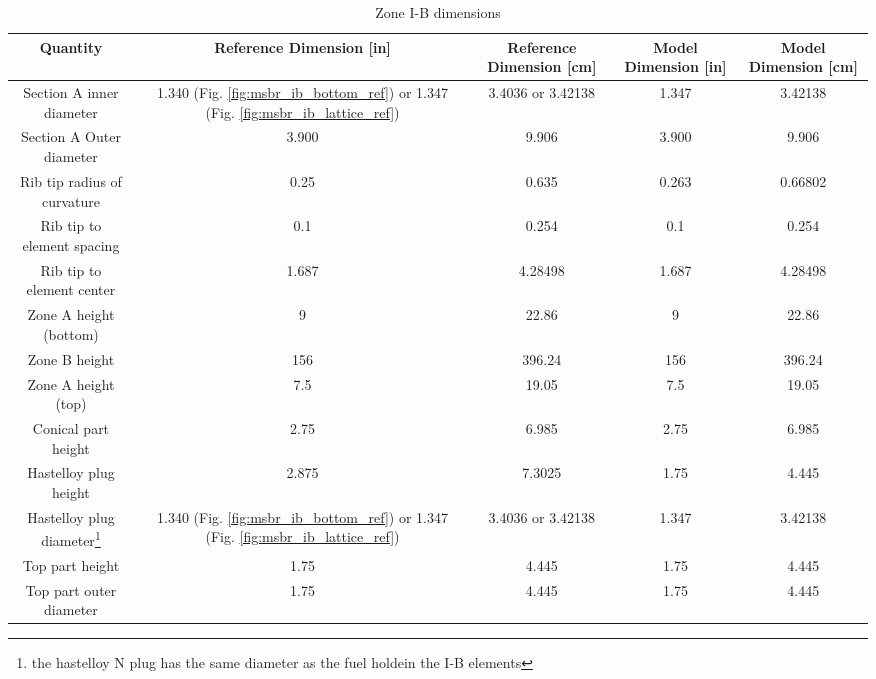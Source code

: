 \begin{table}[htpb]
    \centering
    \caption{Zone I-B dimensions}
    \label{tab:zone-ib-specs}
    \begin{tabulary}{\linewidth}{|C|CC|CC|}
    \hline
    Quantity & Reference Dimension [in] & Reference Dimension [\unit{\centi\metre}] & Model Dimension [in] & Model Dimension [\unit{\centi\metre}]\\
    \hline
    Section A inner diameter & 1.340 (Fig. \ref{fig:msbr_ib_bottom_ref}) or 1.347 (Fig. \ref{fig:msbr_ib_lattice_ref}) & 3.4036 or 3.42138 & 1.347 & 3.42138 \\
    \hline
    Section A Outer diameter & 3.900 & 9.906 & 3.900 & 9.906 \\
    \hline
    Rib tip radius of curvature & 0.25 & 0.635 & 0.263 & 0.66802\\
    \hline
    Rib tip to element spacing & 0.1 & 0.254 & 0.1 & 0.254\\
    \hline
    Rib tip to element center & 1.687 & 4.28498 & 1.687 & 4.28498\\
    \hline
    Zone A height (bottom) & 9 & 22.86 & 9 & 22.86\\
    \hline
    Zone B height & 156 & 396.24 & 156 & 396.24\\
    \hline
    Zone A height (top) & 7.5 & 19.05 & 7.5 & 19.05\\
    \hline
    Conical part height & 2.75 & 6.985 & 2.75 & 6.985\\
    \hline
    Hastelloy plug height & 2.875 & 7.3025 & 1.75 & 4.445 \\
    \hline
    Hastelloy plug diameter\footnote{the hastelloy N plug has the same diameter as the fuel holdein the I-B elements} & 1.340 (Fig. \ref{fig:msbr_ib_bottom_ref}) or 1.347 (Fig. \ref{fig:msbr_ib_lattice_ref}) & 3.4036 or 3.42138 & 1.347 & 3.42138 \\
    \hline
    Top part height & 1.75 & 4.445 & 1.75 & 4.445 \\
    \hline
    Top part outer diameter & 1.75 & 4.445 & 1.75 & 4.445\\
    \hline
    \end{tabulary}
\end{table}



